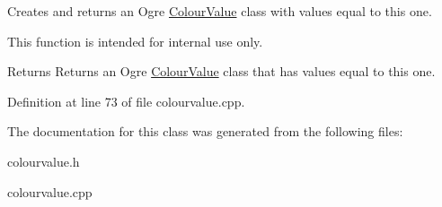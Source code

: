 Creates and returns an Ogre \hyperlink{classphys_1_1ColourValue}{ColourValue} class with values equal to this one. 

This function is intended for internal use only. \begin{DoxyReturn}{Returns}
Returns an Ogre \hyperlink{classphys_1_1ColourValue}{ColourValue} class that has values equal to this one. 
\end{DoxyReturn}


Definition at line 73 of file colourvalue.cpp.



The documentation for this class was generated from the following files:\begin{DoxyCompactItemize}
\item 
colourvalue.h\item 
colourvalue.cpp\end{DoxyCompactItemize}
